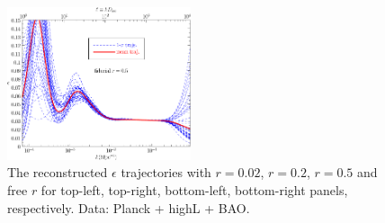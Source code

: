 \documentclass[11pt]{article}
\def \halffigwidth{0.48\textwidth}
\begin{document}
\begin{figure}
  \includegraphics[width=\halffigwidth]{nobicep_spline0_p11_r0d5_eps_traj.pdf}
  \caption{The reconstructed $\epsilon$ trajectories with $r = 0.02$, $r=0.2$, $r=0.5$ and free $r$ for top-left, top-right, bottom-left, bottom-right panels, respectively. Data: Planck + highL + BAO. \label{fig:traj_eps}}
\end{figure}
\end{document}
